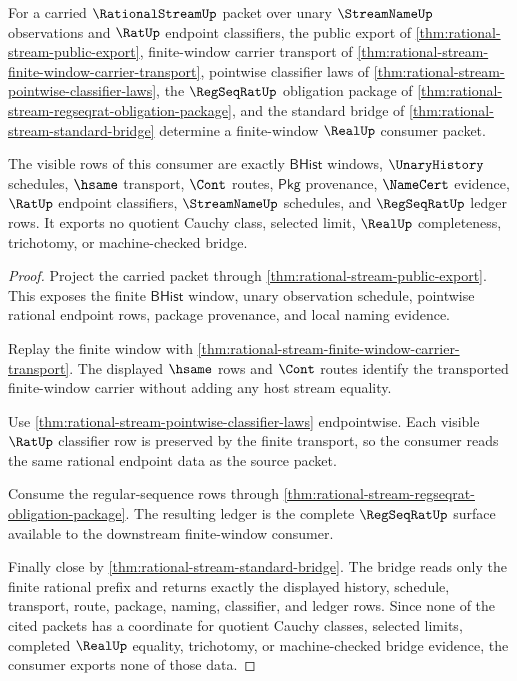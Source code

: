 \begin{theorem}\label{thm:rational-stream-realup-finite-window-consumer-example}
For a carried $\RationalStreamUp$ packet over unary $\StreamNameUp$
observations and $\RatUp$ endpoint classifiers, the public export of
\autoref{thm:rational-stream-public-export}, finite-window carrier transport of
\autoref{thm:rational-stream-finite-window-carrier-transport}, pointwise
classifier laws of
\autoref{thm:rational-stream-pointwise-classifier-laws}, the $\RegSeqRatUp$
obligation package of
\autoref{thm:rational-stream-regseqrat-obligation-package}, and the standard
bridge of \autoref{thm:rational-stream-standard-bridge} determine a
finite-window $\RealUp$ consumer packet.

The visible rows of this consumer are exactly $\mathsf{BHist}$ windows,
$\UnaryHistory$ schedules, $\hsame$ transport, $\Cont$ routes, $\mathsf{Pkg}$
provenance, $\NameCert$ evidence, $\RatUp$ endpoint classifiers,
$\StreamNameUp$ schedules, and $\RegSeqRatUp$ ledger rows. It exports no
quotient Cauchy class, selected limit, $\RealUp$ completeness, trichotomy, or
machine-checked bridge.
\end{theorem}
\begin{proof}
Project the carried packet through \autoref{thm:rational-stream-public-export}.
This exposes the finite $\mathsf{BHist}$ window, unary observation schedule,
pointwise rational endpoint rows, package provenance, and local naming
evidence.

Replay the finite window with
\autoref{thm:rational-stream-finite-window-carrier-transport}. The displayed
$\hsame$ rows and $\Cont$ routes identify the transported finite-window carrier
without adding any host stream equality.

Use \autoref{thm:rational-stream-pointwise-classifier-laws} endpointwise. Each
visible $\RatUp$ classifier row is preserved by the finite transport, so the
consumer reads the same rational endpoint data as the source packet.

Consume the regular-sequence rows through
\autoref{thm:rational-stream-regseqrat-obligation-package}. The resulting
ledger is the complete $\RegSeqRatUp$ surface available to the downstream
finite-window consumer.

Finally close by \autoref{thm:rational-stream-standard-bridge}. The bridge
reads only the finite rational prefix and returns exactly the displayed
history, schedule, transport, route, package, naming, classifier, and ledger
rows. Since none of the cited packets has a coordinate for quotient Cauchy
classes, selected limits, completed $\RealUp$ equality, trichotomy, or
machine-checked bridge evidence, the consumer exports none of those data.
\end{proof}

